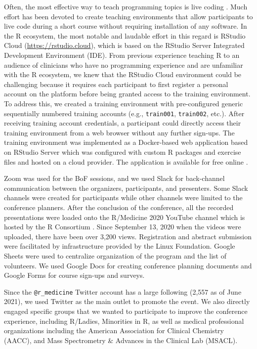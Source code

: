 Often, the most effective way to teach programming topics is live coding
\citep{Wilson2018}. Much effort has been devoted to create teaching
environments that allow participants to live code during a short course
without requiring installation of any software. In the R ecosystem, the
most notable and laudable effort in this regard is RStudio Cloud
(\url{https://rstudio.cloud}), which is based on the RStudio Server
Integrated Development Environment (IDE). From previous experience
teaching R to an audience of clinicians who have no programming
experience and are unfamiliar with the R ecosystem, we knew that the
RStudio Cloud environment could be challenging because it requires each
participant to first register a personal account on the platform before
being granted access to the training environment. To address this, we
created a training environment with pre-configured generic sequentially
numbered training accounts (e.g., \texttt{train001}, \texttt{train002},
etc.). After receiving training account credentials, a participant could
directly access their training environment from a web browser without
any further sign-ups. The training environment was implemented as a
Docker-based web application based on RStudio Server which was
configured with custom R packages and exercise files and hosted on a
cloud provider. The application is available for free online
\citep{arsptrain}.

Zoom was used for the BoF sessions, and we used Slack for back-channel
communication between the organizers, participants, and presenters. Some
Slack channels were created for participants while other channels were
limited to the conference planners. After the conclusion of the
conference, all the recorded presentations were loaded onto the
R/Medicine 2020 YouTube channel which is hosted by the R Consortium
\citeyearpar{youtube1}. Since September 13, 2020 when the videos were
uploaded, there have been over 3,200 views. Registration and abstract
submission were facilitated by infrastructure provided by the Linux
Foundation. Google Sheets were used to centralize organization of the
program and the list of volunteers. We used Google Docs for creating
conference planning documents and Google Forms for course sign-ups and
surveys.

Since the \texttt{@r\_medicine} Twitter account has a large following
(2,557 as of June 2021), we used Twitter as the main outlet to promote
the event. We also directly engaged specific groups that we wanted to
participate to improve the conference experience, including R/Ladies,
Minorities in R, as well as medical professional organizations including
the American Association for Clinical Chemistry (AACC), and Mass
Spectrometry \& Advances in the Clinical Lab (MSACL).

